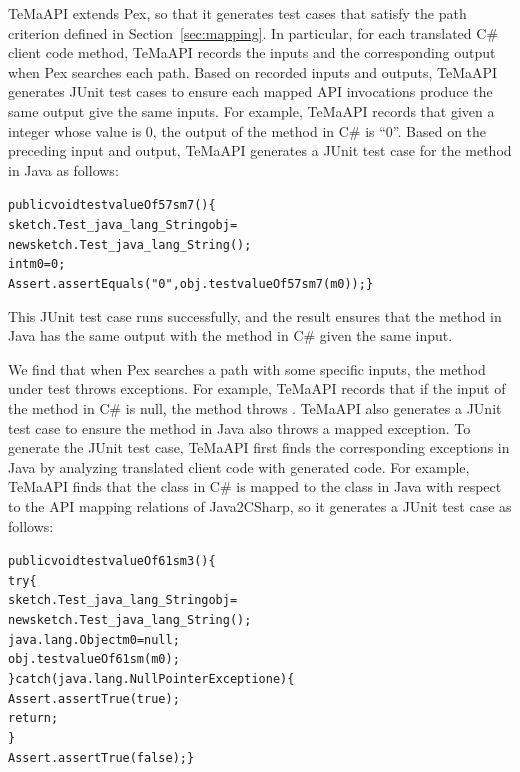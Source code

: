TeMaAPI extends Pex, so that it generates test cases that satisfy the path criterion defined in Section~\ref{sec:mapping}. In particular, for each translated C\# client code method, TeMaAPI records the inputs and the corresponding output when Pex searches each path. Based on recorded inputs and outputs, TeMaAPI generates JUnit test cases to ensure each mapped API invocations produce the same output give the same inputs.
For example, TeMaAPI records that given a integer whose value is 0, the output of the  method in C\# is ``0''. Based on the preceding input and output, TeMaAPI generates a JUnit test case for the  method in Java as follows:

\begin{CodeOut}%
\begin{alltt}
public void testvalueOf57sm7()\{
  sketch.Test_java_lang_String obj =
      new sketch.Test_java_lang_String();
  int m0 = 0;
  Assert.assertEquals("0", obj.testvalueOf57sm7(m0));\}
\end{alltt}
\end{CodeOut}

This JUnit test case runs successfully, and the result ensures that the  method in Java has the same output with the  method in C\# given the same input.


We find that when Pex searches a path with some specific inputs, the method under test throws exceptions.
For example, TeMaAPI records that if the input of the  method in C\# is null, the method throws . TeMaAPI also generates a JUnit test case to ensure the  method in Java also throws a mapped exception. To generate the JUnit test case, TeMaAPI first finds the corresponding exceptions in Java by analyzing translated client code with generated code. For example, TeMaAPI finds that the  class in C\# is mapped to the  class in Java with respect to the API mapping relations of Java2CSharp, so it generates a JUnit test case as follows:

\begin{CodeOut}%
\begin{alltt}
 public void testvalueOf61sm3()\{
   try\{
     sketch.Test_java_lang_String obj =
           new sketch.Test_java_lang_String();
     java.lang.Object m0 = null;
     obj.testvalueOf61sm(m0);
   \}catch(java.lang.NullPointerException e)\{
     Assert.assertTrue(true);
     return;
   \}
   Assert.assertTrue(false); \}
\end{alltt}
\end{CodeOut}

